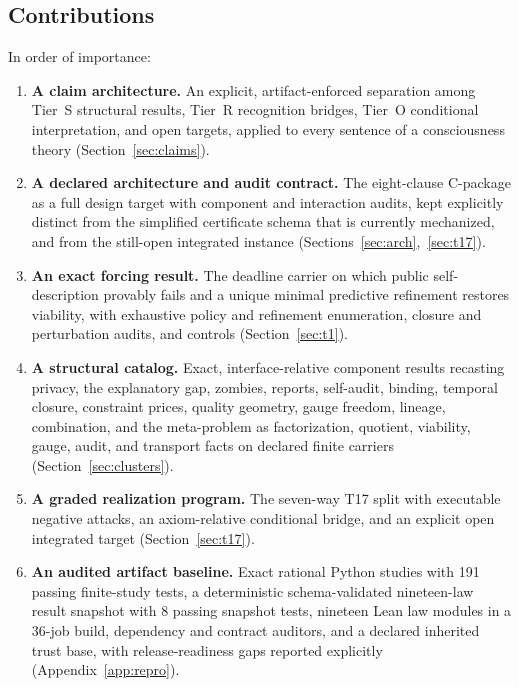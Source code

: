 \documentclass[11pt]{article}
\theoremstyle{definition}
\begin{document}
\subsection{Contributions}
\label{sec:contributions}

In order of importance:

\begin{enumerate}
\item \textbf{A claim architecture.} An explicit, artifact-enforced separation
among Tier~S structural results, Tier~R recognition bridges, Tier~O conditional
interpretation, and open targets, applied to every sentence of a consciousness
theory (Section~\ref{sec:claims}).
\item \textbf{A declared architecture and audit contract.} The eight-clause
C-package as a full design target with component and interaction audits, kept
explicitly distinct from the simplified certificate schema that is currently
mechanized, and from the still-open integrated instance
(Sections~\ref{sec:arch},~\ref{sec:t17}).
\item \textbf{An exact forcing result.} The deadline carrier on which public
self-description provably fails and a unique minimal predictive refinement
restores viability, with exhaustive policy and refinement enumeration, closure
and perturbation audits, and controls (Section~\ref{sec:t1}).
\item \textbf{A structural catalog.} Exact, interface-relative component
results recasting privacy, the explanatory gap, zombies, reports, self-audit,
binding, temporal closure, constraint prices, quality geometry, gauge freedom,
lineage, combination, and the meta-problem as factorization, quotient,
viability, gauge, audit, and transport facts on declared finite carriers
(Section~\ref{sec:clusters}).
\item \textbf{A graded realization program.} The seven-way T17 split with
executable negative attacks, an axiom-relative conditional bridge, and an
explicit open integrated target (Section~\ref{sec:t17}).
\item \textbf{An audited artifact baseline.} Exact rational Python studies with
191 passing finite-study tests, a deterministic schema-validated nineteen-law
result snapshot with 8 passing snapshot tests, nineteen Lean law modules in a
36-job build, dependency and contract auditors, and a declared inherited trust
base, with release-readiness gaps reported explicitly
(Appendix~\ref{app:repro}).
\end{enumerate}
\end{document}
